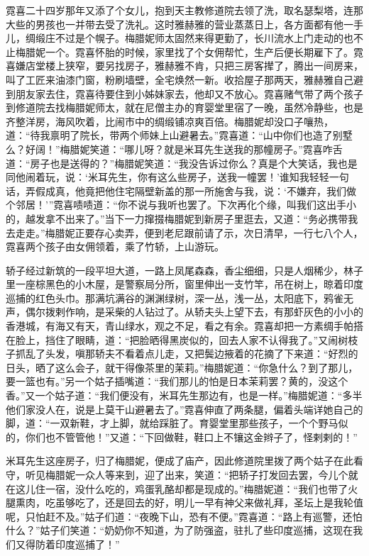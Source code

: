 \par 霓喜二十四岁那年又添了个女儿，抱到天主教修道院去领了洗，取名瑟梨塔，连那大些的男孩也一并带去受了洗礼。这时雅赫雅的营业蒸蒸日上，各方面都有他一手儿，绸缎庄不过是个幌子。梅腊妮师太固然来得更勤了，长川流水上门走动的也不止梅腊妮一个。霓喜怀胎的时候，家里找了个女佣帮忙，生产后便长期雇下了。霓喜嫌店堂楼上狭窄，要另找房子，雅赫雅不肯，只把三房客撵了，腾出一间房来，叫了工匠来油漆门窗，粉刷墙壁，全宅焕然一新。收拾屋子那两天，雅赫雅自己避到朋友家去住，霓喜待要住到小姊妹家去，他却又不放心。霓喜赌气带了两个孩子到修道院去找梅腊妮师太，就在尼僧主办的育婴堂里宿了一晚，虽然冷静些，也是齐整洋房，海风吹着，比闹市中的绸缎铺凉爽百倍。梅腊妮却没口子嚷热，道：“待我禀明了院长，带两个师妹上山避暑去。”霓喜道：“山中你们也造了别墅么？好阔！”梅腊妮笑道：“哪儿呀？就是米耳先生送我的那幢房子。”霓喜咋舌道：“房子也是送得的？”梅腊妮笑道：“我没告诉过你么？真是个大笑话，我也是同他闹着玩，说：‘米耳先生，你有这么些房子，送我一幢罢！’谁知我轻轻一句话，弄假成真，他竟把他住宅隔壁新盖的那一所施舍与我，说：‘不嫌弃，我们做个邻居！'”霓喜啧啧道：“你不说与我听也罢了。下次再化个缘，叫我们这出手小的，越发拿不出来了。”当下一力撺掇梅腊妮到新房子里逛去，又道：“务必携带我去走走。”梅腊妮正要存心卖弄，便到老尼跟前请了示，次日清早，一行七八个人，霓喜两个孩子由女佣领着，乘了竹轿，上山游玩。
\par 轿子经过新筑的一段平坦大道，一路上凤尾森森，香尘细细，只是人烟稀少，林子里一座棕黑色的小木屋，是警察局分所，窗里伸出一支竹竿，吊在树上，晾着印度巡捕的红色头巾。那满坑满谷的渊渊绿树，深一丛，浅一丛，太阳底下，鸦雀无声，偶尔拨剌作响，是采柴的人钻过了。从轿夫头上望下去，有那虾灰色的小小的香港城，有海又有天，青山绿水，观之不足，看之有余。霓喜却把一方素绸手帕搭在脸上，挡住了眼睛，道：“把脸晒得黑炭似的，回去人家不认得我了。”又闹树枝子抓乱了头发，嗔那轿夫不看着点儿走，又把鬓边掖着的花摘了下来道：“好烈的日头，晒了这么会子，就干得像茶里的茉莉。”梅腊妮道：“你急什么？到了那儿，要一篮也有。”另一个姑子插嘴道：“我们那儿的怕是日本茉莉罢？黄的，没这个香。”又一个姑子道：“我们便没有，米耳先生那边有，也是一样。”梅腊妮道：“多半他们家没人在，说是上莫干山避暑去了。”霓喜伸直了两条腿，偏着头端详她自己的脚，道：“一双新鞋，才上脚，就给踩脏了。育婴堂里那些孩子，一个个野马似的，你们也不管管他！”又道：“下回做鞋，鞋口上不镶这金辫子了，怪剌剌的！”
\par 米耳先生这座房子，归了梅腊妮，便成了庙产，因此修道院里拨了两个姑子在此看守，听见梅腊妮一众人等来到，迎了出来，笑道：“把轿子打发回去罢，今儿个就在这儿住一宿，没什么吃的，鸡蛋乳酪却都是现成的。”梅腊妮道：“我们也带了火腿熏肉，吃虽够吃了，还是回去的好，明儿一早有神父来做礼拜，圣坛上是我轮值呢，只怕赶不及。”姑子们道：“夜晚下山，恐有不便。”霓喜道：“路上有巡警，还怕什么？”姑子们笑道：“奶奶你不知道，为了防强盗，驻扎了些印度巡捕，这现在我们又得防着印度巡捕了！”
